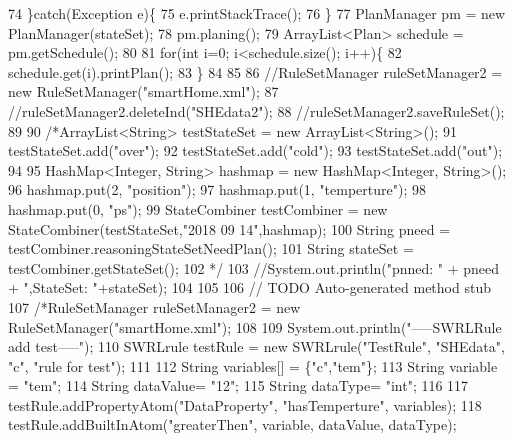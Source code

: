 \begin{DoxyCode}
74         \}\textcolor{keywordflow}{catch}(Exception e)\{
75             e.printStackTrace();
76         \}
77         PlanManager pm = \textcolor{keyword}{new} PlanManager(stateSet);
78         pm.planing();
79         ArrayList<Plan> schedule = pm.getSchedule();
80         
81         \textcolor{keywordflow}{for}(\textcolor{keywordtype}{int} i=0; i<schedule.size(); i++)\{
82             schedule.get(i).printPlan();
83         \}
84         
85     
86         \textcolor{comment}{//RuleSetManager ruleSetManager2 = new RuleSetManager("smartHome.xml");}
87         \textcolor{comment}{//ruleSetManager2.deleteInd("SHEdata2");}
88         \textcolor{comment}{//ruleSetManager2.saveRuleSet();}
89         
90         \textcolor{comment}{/*ArrayList<String> testStateSet = new ArrayList<String>();}
91 \textcolor{comment}{        testStateSet.add("over");}
92 \textcolor{comment}{        testStateSet.add("cold");}
93 \textcolor{comment}{        testStateSet.add("out");    }
94 \textcolor{comment}{        }
95 \textcolor{comment}{        HashMap<Integer, String> hashmap = new HashMap<Integer, String>();}
96 \textcolor{comment}{        hashmap.put(2, "position");}
97 \textcolor{comment}{        hashmap.put(1, "temperture");}
98 \textcolor{comment}{        hashmap.put(0, "ps");}
99 \textcolor{comment}{        StateCombiner testCombiner = new StateCombiner(testStateSet,"2018 09 14",hashmap);}
100 \textcolor{comment}{        String pneed = testCombiner.reasoningStateSetNeedPlan();}
101 \textcolor{comment}{        String stateSet = testCombiner.getStateSet();}
102 \textcolor{comment}{        */}
103         \textcolor{comment}{//System.out.println("pnned: " + pneed + ",StateSet: "+stateSet);}
104         
105         
106         \textcolor{comment}{// TODO Auto-generated method stub}
107         \textcolor{comment}{/*RuleSetManager ruleSetManager2 = new RuleSetManager("smartHome.xml");}
108 \textcolor{comment}{        }
109 \textcolor{comment}{        System.out.println("-----SWRLRule add test-----");}
110 \textcolor{comment}{        SWRLrule testRule = new SWRLrule("TestRule", "SHEdata", "c", "rule for test");}
111 \textcolor{comment}{        }
112 \textcolor{comment}{        String variables[]  = \{"c","tem"\};}
113 \textcolor{comment}{        String variable = "tem";}
114 \textcolor{comment}{        String dataValue= "12";}
115 \textcolor{comment}{        String dataType= "int";}
116 \textcolor{comment}{        }
117 \textcolor{comment}{        testRule.addPropertyAtom("DataProperty", "hasTemperture", variables);}
118 \textcolor{comment}{        testRule.addBuiltInAtom("greaterThen", variable, dataValue, dataType);}

\end{DoxyCode}
